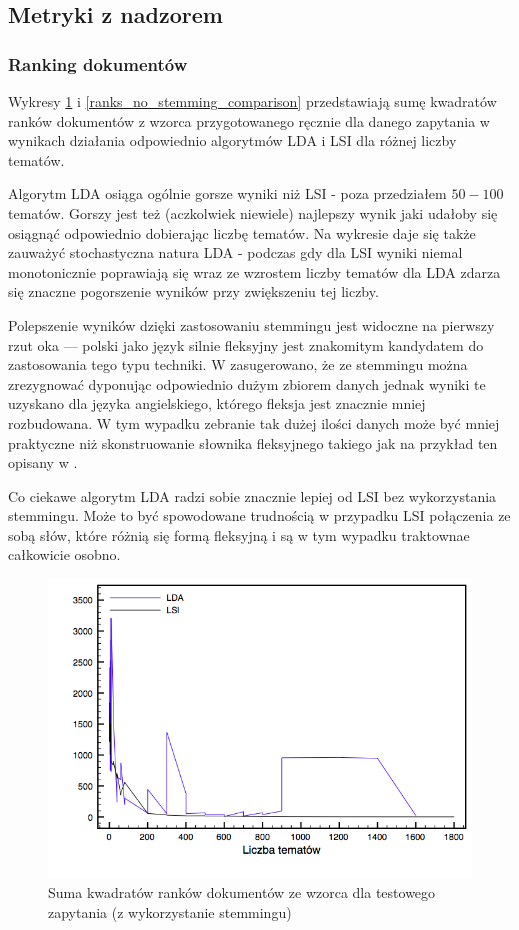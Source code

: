 \documentclass[11pt,a4paper]{article}
\begin{document}
\subsection{Metryki z nadzorem}

\subsubsection{Ranking dokumentów}

Wykresy \ref{ranks_stemming_comparison} i \ref{ranks_no_stemming_comparison}
przedstawiają sumę kwadratów ranków dokumentów z wzorca przygotowanego ręcznie
dla danego zapytania w wynikach działania odpowiednio algorytmów LDA i LSI dla
różnej liczby tematów.

Algorytm LDA osiąga ogólnie gorsze wyniki niż LSI - poza przedziałem $50 - 100$
tematów. Gorszy jest też (aczkolwiek niewiele) najlepszy wynik jaki udałoby się
osiągnąć odpowiednio dobierając liczbę tematów. Na wykresie daje się także
zauważyć stochastyczna natura LDA - podczas gdy dla LSI wyniki niemal
monotonicznie poprawiają się wraz ze wzrostem liczby tematów dla LDA zdarza się
znaczne pogorszenie wyników przy zwiększeniu tej liczby.

Polepszenie wyników dzięki zastosowaniu stemmingu jest widoczne na pierwszy
rzut oka --- polski jako język silnie fleksyjny jest znakomitym kandydatem do
zastosowania tego typu techniki. W \cite{manning-schuetze} zasugerowano, że ze
stemmingu można zrezygnować dyponując odpowiednio dużym zbiorem danych jednak
wyniki te uzyskano dla języka angielskiego, którego fleksja jest znacznie mniej
rozbudowana. W tym wypadku zebranie tak dużej ilości danych może być mniej
praktyczne niż skonstruowanie słownika fleksyjnego takiego jak na przykład ten
opisany w \cite{pisarek-slownik}.

Co ciekawe algorytm LDA radzi sobie znacznie lepiej od LSI bez wykorzystania
stemmingu.  Może to być spowodowane trudnością w przypadku LSI połączenia ze
sobą słów, które różnią się formą fleksyjną i są w tym wypadku traktownae
całkowicie osobno.

\begin{figure}[h]
\caption{Suma kwadratów ranków dokumentów ze wzorca dla testowego zapytania (z wykorzystanie stemmingu)}
\label{ranks_stemming_comparison}
\includegraphics[width=\linewidth]{gfx/ranks_stemming.png}
\end{figure}
\end{document}
